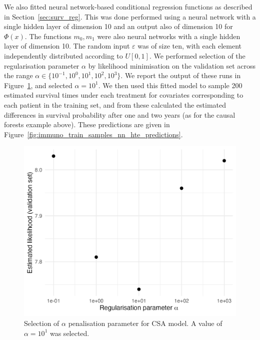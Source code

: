 \documentclass[../thesis.tex]{subfiles}
\begin{document}
We also fitted neural network-based conditional regression functions as described in Section~\ref{sec:surv_reg}. This was done performed using a neural network with a single hidden layer of dimension 10 and an output also of dimension 10 for $\Phi(x)$. The functions $m_0,m_1$ were also neural networks with a single hidden layer of dimension 10. The random input $\varepsilon$ was of size ten, with each element independently distributed according to $U[0,1]$. We performed selection of the regularisation parameter $\alpha$ by likelihood minimisation on the validation set across the range $\alpha \in \{10^{-1}, 10^{0}, 10^1, 10^2, 10^3\}$. We report the output of these runs in Figure~\ref{fig:alpha_selection}, and selected $\alpha = 10^1$. We then used this fitted model to sample 200 estimated survival times under each treatment for covariates corresponding to each patient in the training set, and from these calculated the estimated differences in survival probability after one and two years (as for the causal forests example above). These predictions are given in Figure~\ref{fig:immuno_train_samples_nn_hte_predictions}.

\begin{figure}[!tpb] 
\centering
\includegraphics[width=.6\textwidth]{figures/chapter4/alpha_selection_fig.png} 

\caption{Selection of $\alpha$ penalisation parameter for CSA model. A value of $\alpha=10^1$ was selected. \label{fig:alpha_selection}}
\end{figure}
\end{document}
